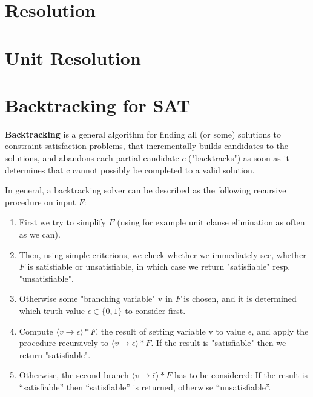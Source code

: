\documentclass[12pt]{book}
\begin{document}
\section{Resolution}
\label{sec:Resolution}

\section{Unit Resolution}
\label{sec:Unit Resolution}
\section{Backtracking for SAT}
\label{sec:Backtracking for SAT}
\begin{defi}\label{def:bsat} \textbf{Backtracking} is a general algorithm for finding all (or some) solutions to constraint satisfaction problems, 
that incrementally builds candidates to the solutions, and abandons each partial candidate $c$ ("backtracks") as soon as it determines that c cannot 
possibly be completed to a valid solution. 

In general, a backtracking solver can be described as the following recursive procedure on input $F$:
\begin{enumerate}
\item First we try to simplify $F$ (using for example unit clause elimination as often as we can).
\item Then, using simple criterions, we check whether we immediately see, whether $F$ is satisfiable or
unsatisfiable, in which case we return "satisfiable" resp. "unsatisfiable".
\item Otherwise some "branching variable" v in $F$ is chosen, and it is determined which truth value $\epsilon \in \{ 0, 1\}$ to consider first.
\item Compute $\langle v \to \epsilon \rangle * F$, the result of setting variable v to value $\epsilon$, and apply the procedure recursively to
$\langle v \to \epsilon \rangle * F$. If the result is "satisfiable" then we return "satisfiable".
\item Otherwise, the second branch $\langle v \to \overline{\epsilon} \rangle * F$ has to be considered: If the result is “satisfiable” then
“satisfiable” is returned, otherwise “unsatisfiable”.
\end{enumerate}
\end{defi}
\end{document}
